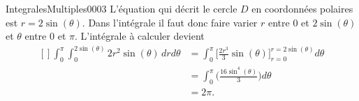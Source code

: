 \begin{corrige}{IntegralesMultiples0003}
  L'équation qui décrit le cercle $D$ en coordonnées polaires est $r=2\sin(\theta)$. Dans l'intégrale il faut donc faire varier $r$ entre $0$ et $2\sin(\theta)$ et $\theta$ entre $0$ et $\pi$.
L'intégrale à calculer devient
	\begin{equation}
		\begin{aligned}[]
			\int_0^{\pi}\int_{0}^{2\sin(\theta)}2r^2\sin(\theta)\,drd\theta&=\int_0^{\pi}\big[ \frac{ 2r^3 }{ 3 }\sin(\theta) \big]_{r=0}^{r=2\sin(\theta)}d\theta\\
			&=\int_0^{\pi}\big(\frac{ 16\sin^4(\theta) }{ 3 } \big)d\theta\\
			&=2\pi.
		\end{aligned}
	\end{equation}

\end{corrige}
